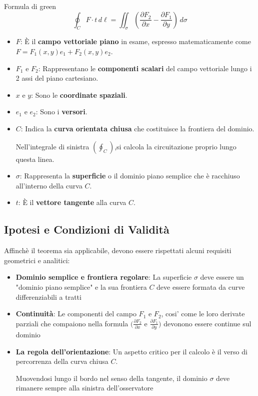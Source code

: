 \begin{definizione}{Formula di green}
    {\large
        $$
        \oint_{C} F \cdot t \, d\ell = \iint_{\sigma}(\frac{\partial F_{2}}{\partial x} - \frac{\partial F_{1}}{\partial y}) \, d\sigma
        $$
    }
    \begin{itemize}
        \item $F$: È il \textbf{campo vettoriale piano} in esame, espresso matematicamente come $F = F_{1}(x,y)e_{1} + F_{2}(x,y)e_{2}$.
        \item $F_{1}$ e $F_{2}$: Rappresentano le \textbf{componenti scalari} del campo vettoriale lungo i 2 assi del piano cartesiano.
        \item $x$ e $y$: Sono le \textbf{coordinate spaziali}.
        \item $e_{1}$ e $e_{2}$: Sono i \textbf{versori}.
        \item $C$: Indica la \textbf{curva orientata chiusa} che costituisce la frontiera del dominio.

        Nell'integrale di sinistra $(\oint_{C})$,si calcola la circuitazione proprio lungo questa linea.
        \item $\sigma$: Rappresenta la \textbf{superficie} o il dominio piano semplice che è racchiuso all'interno della curva $C$.
        \item $t$: È il \textbf{vettore tangente} alla curva $C$.
    \end{itemize}
\end{definizione}

\subsection{Ipotesi e Condizioni di Validità}
Affinchè il teorema sia applicabile, devono essere rispettati alcuni requisiti geometrici e analitici:
\begin{itemize}
    \item \textbf{Dominio semplice e frontiera regolare}: La superficie $\sigma$ deve essere un "dominio piano semplice" e la sua frontiera $C$ deve essere formata da curve differenziabili a tratti
    \item \textbf{Continuità}: Le componenti del campo $F_{1}$ e $F_{2}$, cosi' come le loro derivate parziali che compaiono nella formula $(\frac{\partial F_{2}}{\partial x}$ e $\frac{\partial F_{1}}{\partial y})$ devonono essere continue sul dominio
    \item \textbf{La regola dell'orientazione}: Un aspetto critico per il calcolo è il verso di percorrenza della curva chiusa $C$.
    
    Muovendosi lungo il bordo nel senso della tangente, il dominio $\sigma$ deve rimanere sempre alla sinistra dell'osservatore
\end{itemize}
